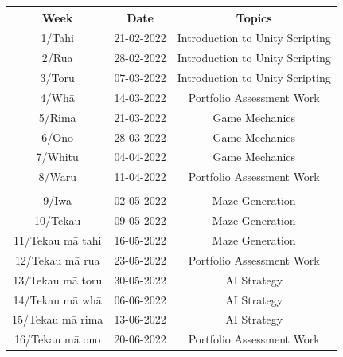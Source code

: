 \documentclass{article}
\begin{document}
\renewcommand{\arraystretch}{1.5}
\begin{tabular}{|c|c|c|c|}
	\hline
	\textbf{Week}                  & \textbf{Date}            & \multicolumn{2}{c|}{\textbf{Topics}}                                                                                             \\ \hline
	\footnotesize 1/Tahi           & \footnotesize 21-02-2022 & \multicolumn{2}{c|}{\footnotesize Introduction to Unity Scripting}    \\ \hline
	\footnotesize 2/Rua            & \footnotesize 28-02-2022 & \multicolumn{2}{c|}{\footnotesize Introduction to Unity Scripting}    \\ \hline
	\footnotesize 3/Toru           & \footnotesize 07-03-2022 & \multicolumn{2}{c|}{\footnotesize Introduction to Unity Scripting}    \\ \hline
	\footnotesize 4/Whā            & \footnotesize 14-03-2022 & \multicolumn{2}{c|}{\footnotesize Portfolio Assessment Work}    \\ \hline
	\footnotesize 5/Rima           & \footnotesize 21-03-2022 & \multicolumn{2}{c|}{\footnotesize Game Mechanics}    \\ \hline
	\footnotesize 6/Ono            & \footnotesize 28-03-2022 & \multicolumn{2}{c|}{\footnotesize Game Mechanics}    \\ \hline
	\footnotesize 7/Whitu          & \footnotesize 04-04-2022 & \multicolumn{2}{c|}{\footnotesize Game Mechanics}    \\ \hline
	\footnotesize 8/Waru           & \footnotesize 11-04-2022 & \multicolumn{2}{c|}{\footnotesize Portfolio Assessment Work}    \\ \hline
	\rowcolor{yellow} \multicolumn{4}{|c|}{\footnotesize Mid Term Break}                                                                                                                         \\ \hline
	\footnotesize 9/Iwa            & \footnotesize 02-05-2022 & \multicolumn{2}{c|}{\footnotesize Maze Generation}    \\ \hline
	\footnotesize 10/Tekau         & \footnotesize 09-05-2022 & \multicolumn{2}{c|}{\footnotesize Maze Generation}    \\ \hline
	\footnotesize 11/Tekau mā tahi & \footnotesize 16-05-2022 & \multicolumn{2}{c|}{\footnotesize Maze Generation}    \\ \hline
	\footnotesize 12/Tekau mā rua  & \footnotesize 23-05-2022 & \multicolumn{2}{c|}{\footnotesize Portfolio Assessment Work}    \\ \hline
	\footnotesize 13/Tekau mā toru & \footnotesize 30-05-2022 & \multicolumn{2}{c|}{\footnotesize AI Strategy}    \\ \hline
	\footnotesize 14/Tekau mā whā  & \footnotesize 06-06-2022 & \multicolumn{2}{c|}{\footnotesize AI Strategy}    \\ \hline
	\footnotesize 15/Tekau mā rima & \footnotesize 13-06-2022 & \multicolumn{2}{c|}{\footnotesize AI Strategy}    \\ \hline
	\footnotesize 16/Tekau mā ono  & \footnotesize 20-06-2022 & \multicolumn{2}{c|}{\footnotesize Portfolio Assessment Work}    \\ \hline
\end{tabular} 
\end{document}
